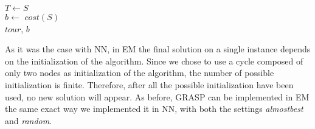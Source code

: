 \begin{algorithm}[H]
    \BlankLine
    $T \gets S$\\
    $b \gets$ $cost(S)$\\
    \Return $tour$, $b$\\
    
\end{algorithm}

As it was the case with NN, in EM the final solution on a single instance depends on the initialization of the algorithm.
Since we chose to use a cycle composed of only two nodes as initialization of the algorithm, the number of possible initialization is finite.
Therefore, after all the possible initialization have been used, no new solution will appear.
As before, GRASP can be implemented in EM the same exact way we implemented it in NN, with both the settings \textit{almostbest} and \textit{random}.



